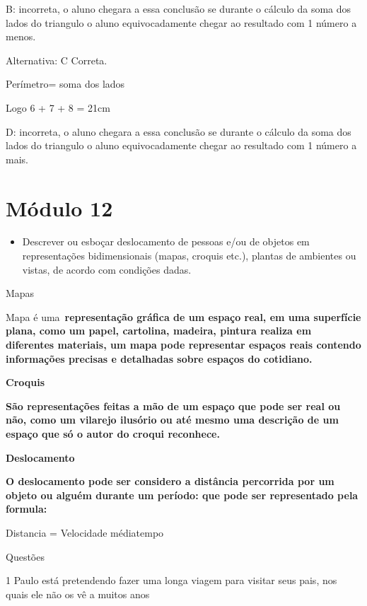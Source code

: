 B: incorreta, o aluno chegara a essa conclusão se durante o cálculo da
soma dos lados do triangulo o aluno equivocadamente chegar ao resultado
com 1 número a menos.

Alternativa: C Correta.

Perímetro= soma dos lados

Logo 6 + 7 + 8 = 21cm

D: incorreta, o aluno chegara a essa conclusão se durante o cálculo da
soma dos lados do triangulo o aluno equivocadamente chegar ao resultado
com 1 número a mais.

\chapter{Módulo 12}

\begin{itemize}
\tightlist

\item 
  Descrever ou esboçar deslocamento de pessoas e/ou de objetos em
  representações bidimensionais (mapas, croquis etc.), plantas de
  ambientes ou vistas, de acordo com condições dadas.
\end{itemize}

Mapas

Mapa é uma~\textbf{representação gráfica de um espaço real, em uma
superfície plana, como um papel, cartolina, madeira, pintura realiza em
diferentes materiais, um mapa pode representar espaços reais contendo
informações precisas e detalhadas sobre espaços do cotidiano.}

\textbf{Croquis}

\textbf{São representações feitas a mão de um espaço que pode ser real
ou não, como um vilarejo ilusório ou até mesmo uma descrição de um
espaço que só o autor do croqui reconhece.}

\textbf{Deslocamento}

\textbf{O deslocamento pode ser considero a distância percorrida por um
objeto ou alguém durante um período: que pode ser representado pela
formula:}

Distancia = Velocidade média\times tempo

Questões

\num{1} Paulo está pretendendo fazer uma longa viagem para visitar seus pais,
nos quais ele não os vê a muitos anos

